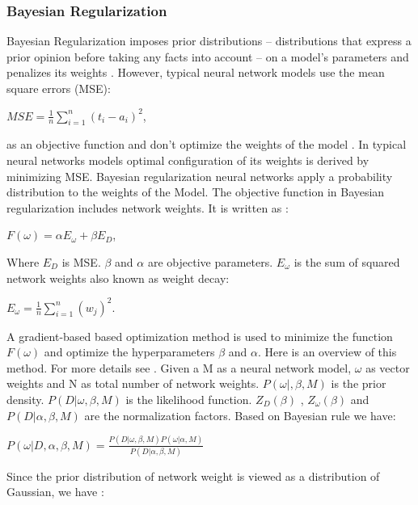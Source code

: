 \documentclass[oneside,12pt,article]{article}
\begin{document}
\subsubsection{Bayesian Regularization}

Bayesian Regularization imposes prior distributions – distributions that express a prior opinion before taking any facts into account – on a model's parameters and penalizes its weights \cite{okut2016bayesian}. However, typical neural network models use the mean square errors (MSE):

 \begin{center}
 $MSE= \frac{1}{n} \sum_{i=1}^{n}(t_i - a_i)^2$,
\end{center}
as an objective function and don't optimize the weights of the model \cite{sariev2020bayesian}. In typical neural networks models optimal configuration of its weights is derived by minimizing MSE. Bayesian regularization neural networks apply a probability distribution to the weights of the Model. The objective function in Bayesian regularization includes network weights. It is written as \cite{sariev2020bayesian}: 

 \begin{center}
 $F(\omega)= \alpha E_\omega + \beta E_D $,
\end{center}
Where $ E_D $ is MSE. $\beta$ and $\alpha$ are objective parameters. $ E_\omega $ is the sum of squared network weights also known as weight decay:
 \begin{center}
 $E_\omega = \frac{1}{n} \sum_{i=1}^{n}(w_j)^2 $.
\end{center}
A gradient-based based optimization method is used to minimize the function $F(\omega)$ and optimize the hyperparameters $\beta$ and $\alpha$. Here is an overview of this method. For more details see \cite{yue2011bayesian}\cite{mackay1992practical}. Given a M as a neural network model, $\omega$ as vector weights and N as total number of network weights. $P(\omega|,\beta,M) $ is the prior density. $P(D|\omega, \beta, M)$ is the likelihood function. $Z_D(\beta)$ , $Z_\omega(\beta)$ and $P(D|\alpha, \beta,M) $ are the normalization factors. Based on Bayesian rule we have:  

 \begin{center}
$ P(\omega| D,\alpha, \beta,M) = \frac{P(D|\omega,\beta,M) P(\omega|\alpha,M) }{P(D|\alpha, \beta,M) } $
\end{center}
Since the prior distribution of network weight is viewed as a distribution of Gaussian, we have \cite{kayri2016predictive}: 
\end{document}
